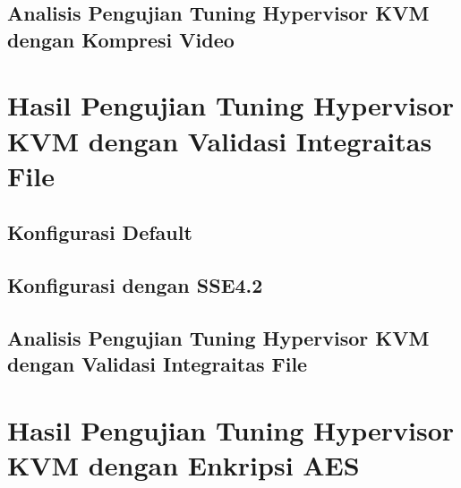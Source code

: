 \subsection{Analisis Pengujian Tuning Hypervisor KVM dengan Kompresi Video}

\section{Hasil Pengujian Tuning Hypervisor KVM dengan Validasi Integraitas File}

\subsection{Konfigurasi Default}

\subsection{Konfigurasi dengan SSE4.2}

\subsection{Analisis Pengujian Tuning Hypervisor KVM dengan Validasi Integraitas File}

\section{Hasil Pengujian Tuning Hypervisor KVM dengan Enkripsi AES}

